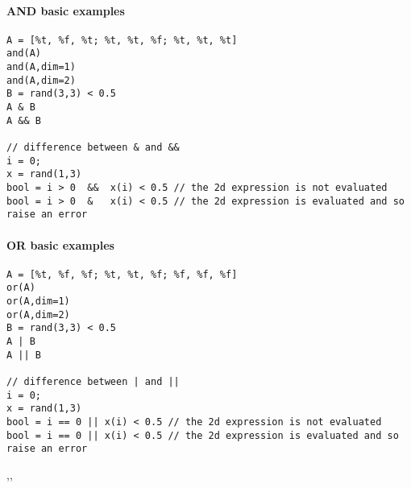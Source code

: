 \begin{examples}
\paragraph{AND basic examples}
\begin{Verbatim}
A = [%t, %f, %t; %t, %t, %f; %t, %t, %t]
and(A)
and(A,dim=1)
and(A,dim=2)
B = rand(3,3) < 0.5
A & B
A && B

// difference between & and &&
i = 0;
x = rand(1,3)
bool = i > 0  &&  x(i) < 0.5 // the 2d expression is not evaluated
bool = i > 0  &   x(i) < 0.5 // the 2d expression is evaluated and so raise an error
\end{Verbatim}

\paragraph{OR basic examples}
\begin{Verbatim}
A = [%t, %f, %f; %t, %t, %f; %f, %f, %f]
or(A)
or(A,dim=1)
or(A,dim=2)
B = rand(3,3) < 0.5
A | B
A || B
    
// difference between | and || 
i = 0;
x = rand(1,3)
bool = i == 0 || x(i) < 0.5 // the 2d expression is not evaluated
bool = i == 0 || x(i) < 0.5 // the 2d expression is evaluated and so raise an error
\end{Verbatim}

\end{examples}

\begin{manseealso}
  ,,   

\end{manseealso}

